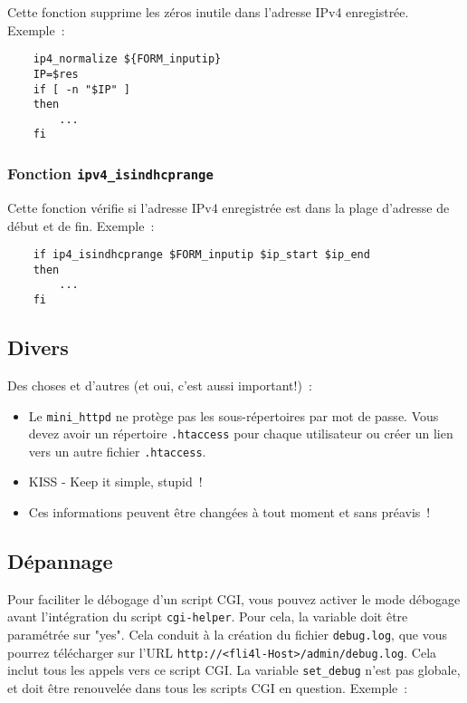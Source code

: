 Cette fonction supprime les zéros inutile dans l'adresse IPv4 enregistrée.
Exemple~:

\begin{example}
\begin{verbatim}
    ip4_normalize ${FORM_inputip}
    IP=$res
    if [ -n "$IP" ]
    then
        ...
    fi
\end{verbatim}
\end{example}


\subsubsection{Fonction \texttt{ipv4\_isindhcprange}}

Cette fonction vérifie si l'adresse IPv4 enregistrée est dans la plage d'adresse
de début et de fin. Exemple~:

\begin{example}
\begin{verbatim}
    if ip4_isindhcprange $FORM_inputip $ip_start $ip_end
    then
        ...
    fi
\end{verbatim}
\end{example}


\subsection{Divers}

Des choses et d'autres (et oui, c'est aussi important!)~:

\begin{itemize}
 \item Le \texttt{mini\_httpd} ne protège pas les sous-répertoires par mot de passe.
      Vous devez avoir un répertoire \texttt{.htaccess} pour chaque utilisateur
      ou créer un lien vers un autre fichier \texttt{.htaccess}.
 \item KISS - Keep it simple, stupid~!
 \item Ces informations peuvent être changées à tout moment et sans préavis~!
\end{itemize}


\subsection{Dépannage}

Pour faciliter le débogage d'un script CGI, vous pouvez activer le mode débogage avant
l'intégration du script \texttt{cgi-helper}. Pour cela, la variable  doit
être paramétrée sur "yes". Cela conduit à la création du fichier \texttt{debug.log}, que
vous pourrez télécharger sur l'URL \texttt{http://<fli4l-Host>/admin/debug.log}. Cela inclut
tous les appels vers ce script CGI. La variable \texttt{set\_debug} n'est pas globale, et
doit être renouvelée dans tous les scripts CGI en question. Exemple~:

